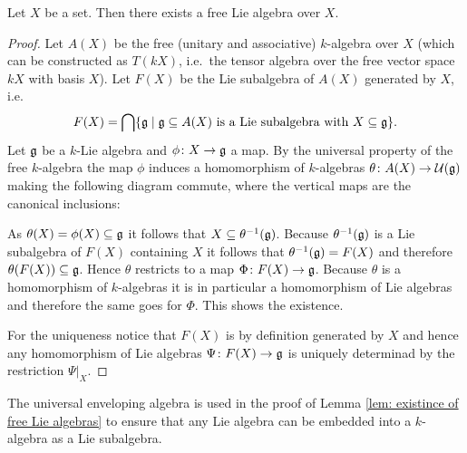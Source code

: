 \begin{lem}\label{lem: existince of free Lie algebras}
 Let $X$ be a set. Then there exists a free Lie algebra over $X$.
\end{lem}
\begin{proof}
 Let $A(X)$ be the free (unitary and associative) $k$-algebra over $X$ (which can be constructed as $T(kX)$, i.e.\ the tensor algebra over the free vector space $kX$ with basis $X$). Let $F(X)$ be the Lie subalgebra of $A(X)$ generated by $X$, i.e.
 \[
  F(X) = \bigcap \{\mathfrak{g} \mid \text{$\mathfrak{g} \subseteq A(X)$ is a Lie subalgebra with $X \subseteq \mathfrak{g}$}\}.
 \]
 Let $\mathfrak{g}$ be a $k$-Lie algebra and $\phi \colon X \to \mathfrak{g}$ a map. By the universal property of the free $k$-algebra the map $\phi$ induces a homomorphism of $k$-algebras $\theta \colon A(X) \to \mathcal{U}(\mathfrak{g})$ making the following diagram commute, where the vertical maps are the canonical inclusions:
 \begin{center}
 \end{center}
 As $\theta(X) = \phi(X) \subseteq \mathfrak{g}$ it follows that $X \subseteq \theta^{-1}(\mathfrak{g})$. Because $\theta^{-1}(\mathfrak{g})$ is a Lie subalgebra of $F(X)$ containing $X$ it follows that $\theta^{-1}(\mathfrak{g}) = F(X)$ and therefore $\theta(F(X)) \subseteq \mathfrak{g}$. Hence $\theta$ restricts to a map $\Phi \colon F(X) \to \mathfrak{g}$. Because $\theta$ is a homomorphism of $k$-algebras it is in particular a homomorphism of Lie algebras and therefore the same goes for $\Phi$. This shows the existence.
 
 For the uniqueness notice that $F(X)$ is by definition generated by $X$ and hence any homomorphism of Lie algebras $\Psi \colon F(X) \to \mathfrak{g}$ is uniquely determinad by the restriction $\Psi|_X$.
\end{proof}


\begin{rem}
 The universal enveloping algebra is used in the proof of Lemma \ref{lem: existince of free Lie algebras} to ensure that any Lie algebra can be embedded into a $k$-algebra as a Lie subalgebra.
\end{rem}


